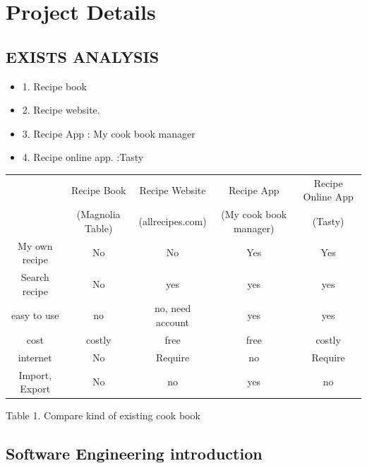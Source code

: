 \documentclass{article}
\begin{document}
\section{Project Details }

\subsection{EXISTS ANALYSIS}

\begin{itemize}
\item 1. Recipe book
\item 2. Recipe website.
\item 3. Recipe App : My cook book manager
\item 4. Recipe online app. :Tasty
\end{itemize}


\begin{center}
 \begin{tabular}{||c c c c c||} 
 \hline
  & Recipe Book & Recipe Website & Recipe App & Recipe Online App \\ [0.5ex] 
  & (Magnolia Table) & (allrecipes.com) & (My cook book manager) & (Tasty) \\ [0.5ex] 
 \hline\hline
My own recipe & No & No & Yes & Yes \\ 
 \hline
 Search recipe & No & yes & yes & yes \\
 \hline
 easy to use & no & no, need account & yes & yes \\
 \hline
 cost & costly & free & free &  costly\\
 \hline
 internet & No & Require & no & Require \\ [1ex] 
 \hline
  Import, Export & No & no & yes & no \\ [1ex] 
 \hline
\end{tabular}
\caption{Table 1.  Compare kind of existing cook book}
\end{center}

\subsection{Software Engineering introduction}
\end{document}
